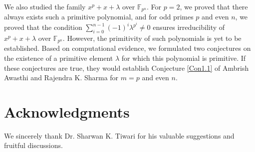 \documentclass[preprint,12pt]{elsarticle}
\begin{document}
        We also studied the family $x^p+x+\lambda$ over $\mathbb{F}_{p^n}$. For $p=2$, we proved that there always exists such a primitive polynomial, and for odd primes $p$ and even $n$, we proved that the condition $\sum_{i=0}^{n-1}(-1)^i\lambda^{p^i}\neq0$ ensures irreducibility of $x^p+x+\lambda$ over $\mathbb{F}_{p^n}$. However, the primitivity of such polynomials is yet to be established. Based on computational evidence, we formulated two conjectures on the existence of a primitive element $\lambda$ for which this polynomial is primitive. If these conjectures are true, they would establish Conjecture \ref{Con1.1} of Ambrish Awasthi and Rajendra K. Sharma for $m=p$ and even $n$.
 
\section{Acknowledgments}
        We sincerely thank Dr. Sharwan K. Tiwari for his valuable suggestions and fruitful discussions.
    



\end{document}
